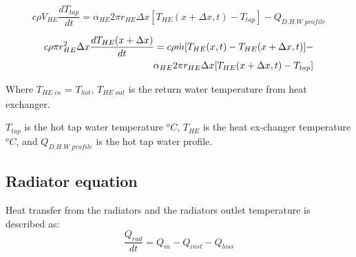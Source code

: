 
\begin{equation}
    c\rho V_{HE}\frac{dT_{tap}}{dt}= \alpha_{HE}2\pi r_{HE}\Delta x[T_{HE}(x+\Delta x,t)- T_{tap}] - Q_{D.H.W_{\_}profile}
\end{equation}



\begin{align}
    c\rho\pi r_{HE}^2\Delta x\frac{dT_{HE}(x+\Delta x)}{dt}=c\rho\Dot{m}[T_{HE}(x,t)-T_{HE}(x+\Delta x,t)]-\notag\\
    \alpha_{HE}2\pi r_{HE}\Delta x[T_{HE}(x+\Delta x,t)- T_{tap}]
\end{align}

Where $T_{HE_{\_}in}$ = $T_{hot}$, $T_{HE_{\_}out}$ is the return water temperature from heat exchanger.

$T_{tap}$ is the hot tap water temperature $^oC$, $T_{HE}$ is the heat ex-changer temperature $^oC$, and $Q_{D.H.W_{\_}profile}$  is the hot tap water profile.



\subsection{Radiator equation}
Heat transfer from the radiators and the radiators outlet temperature is described as:
\begin{equation}
\frac{Q_{rad}}{dt}= Q_{in} -Q_{inst} - Q_{loss}
\end{equation}

